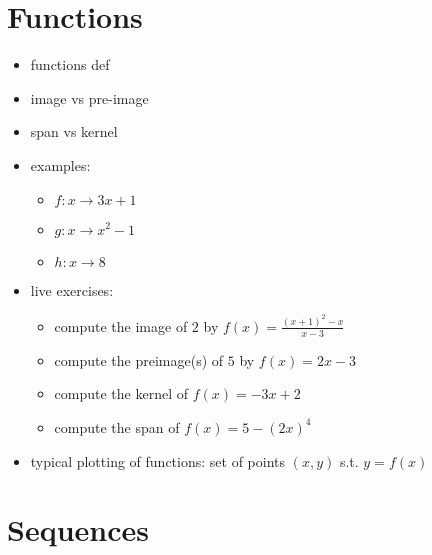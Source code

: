 \hypertarget{functions}{%
\section{Functions}\label{functions}}

\begin{itemize}
\tightlist
\item
  functions def
\item
  image vs pre-image
\item
  span vs kernel
\item
  examples:

  \begin{itemize}
  \tightlist
  \item
    \(f: x \to 3x+1\)
  \item
    \(g: x \to x^2-1\)
  \item
    \(h: x \to 8\)
  \end{itemize}
\item
  live exercises:

  \begin{itemize}
  \tightlist
  \item
    compute the image of \(2\) by \(f(x) = \frac{(x+1)^2 - x}{x-3}\)
  \item
    compute the preimage(s) of \(5\) by \(f(x) = 2x-3\)
  \item
    compute the kernel of \(f(x) = -3x+2\)
  \item
    compute the span of \(f(x) = 5-(2x)^4\)
  \end{itemize}
\item
  typical plotting of functions: set of points \((x,y)\) s.t.
  \(y = f(x)\)
\end{itemize}

\hypertarget{sequences}{%
\section{Sequences}\label{sequences}}

